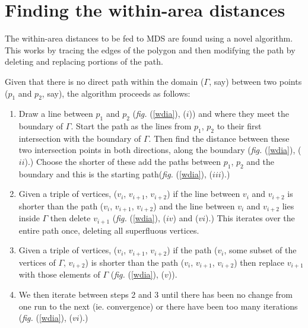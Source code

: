 \documentclass[a4paper,10pt]{article}
\newcommand{\fig}[1]{\emph{fig.} (\ref{#1})}
\begin{document}
\section{Finding the within-area distances}

The within-area distances to be fed to MDS are found using a novel algorithm. This works by tracing the edges of the polygon and then modifying the path by deleting and replacing portions of the path. 

Given that there is no direct path within the domain ($\Gamma$, say) between two points ($p_1$ and $p_2$, say), the algorithm proceeds as follows:

\begin{enumerate}
\item Draw a line between $p_1$ and $p_2$ (\fig{wdia}, ($i$)) and where they meet the boundary of $\Gamma$. Start the path as the lines from $p_1$, $p_2$ to their first intersection with the boundary of $\Gamma$. Then find the distance between these two intersection points in both directions, along the boundary (\fig{wdia}, ($ii$).) Choose the shorter of these add the paths between $p_1$, $p_2$ and the boundary and this is the starting path(\fig{wdia}, ($iii$).) 
\item Given a triple of vertices, ($v_i$, $v_{i+1}$, $v_{i+2}$) if the line between $v_i$ and $v_{i+2}$ is shorter than the path ($v_i$, $v_{i+1}$, $v_{i+2}$) and the line between $v_i$ and $v_{i+2}$ lies inside $\Gamma$ then delete $v_{i+1}$ (\fig{wdia}, ($iv$) and ($vi$).) This iterates over the entire path once, deleting all superfluous vertices. 
\item Given a triple of vertices, ($v_i$, $v_{i+1}$, $v_{i+2}$) if the path ($v_i$, some subset of the vertices of $\Gamma$, $v_{i+2}$) is shorter than the path ($v_i$, $v_{i+1}$, $v_{i+2}$) then replace $v_{i+1}$ with those elements of $\Gamma$ (\fig{wdia}, ($v$)). 
\item We then iterate between steps 2 and 3 until there has been no change from one run to the next (ie. convergence) or there have been too many iterations (\fig{wdia}, ($vi$).)
\end{enumerate}
\end{document}
